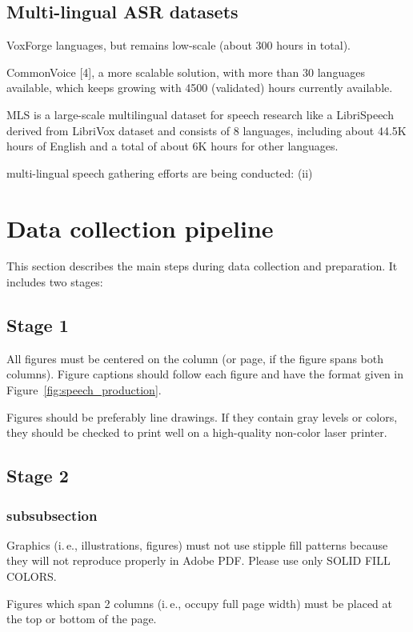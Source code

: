 \documentclass[a4paper]{article}
\begin{document}
\subsection{Multi-lingual ASR datasets}

VoxForge languages, but remains low-scale (about 300 hours in total).


CommonVoice [4], a more scalable solution, with more than 30 languages available, which keeps growing with 4500 (validated) hours currently available.


MLS \cite{pratap2020mls} is a large-scale multilingual dataset for speech research like a LibriSpeech derived from LibriVox dataset and consists of 8 languages, including about 44.5K hours of English and a total of about 6K hours for other languages.

multi-lingual speech gathering efforts are being conducted:  (ii) 

\section{Data collection pipeline}

This section describes the main steps during data collection and preparation. It includes two stages:

\subsection{Stage 1}

All figures must be centered on the column (or page, if the figure spans both columns). Figure captions should follow each figure and have the format given in Figure~\ref{fig:speech_production}.

Figures should be preferably line drawings. If they contain gray levels or colors, they should be checked to print well on a high-quality non-color laser printer.

\subsection{Stage 2}
\subsubsection{subsubsection}
Graphics (i.\,e., illustrations, figures) must not use stipple fill patterns because they will not reproduce properly in Adobe PDF. Please use only SOLID FILL COLORS.

Figures which span 2 columns (i.\,e., occupy full page width) must be placed at the top or bottom of the page.
\end{document}
